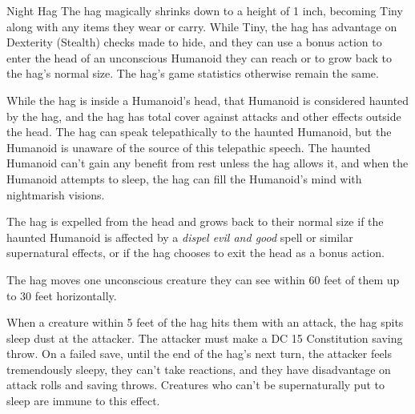 \documentclass[10pt,a4paper,twoside,bg=print,twocolumn,openany,nodeprecatedcode]{dndbook}
\begin{document}
\begin{DndMonster}[float=t]{Night Hag}
The hag magically shrinks down to a height of 1 inch, becoming Tiny along with any items they wear or carry. While Tiny, the hag has advantage on Dexterity (Stealth) checks made to hide, and they can use a bonus action to enter the head of an unconscious Humanoid they can reach or to grow back to the hag's normal size. The hag's game statistics otherwise remain the same.

While the hag is inside a Humanoid's head, that Humanoid is considered haunted by the hag, and the hag has total cover against attacks and other effects outside the head. The hag can speak telepathically to the haunted Humanoid, but the Humanoid is unaware of the source of this telepathic speech. The haunted Humanoid can't gain any benefit from rest unless the hag allows it, and when the Humanoid attempts to sleep, the hag can fill the Humanoid's mind with nightmarish visions.

The hag is expelled from the head and grows back to their normal size if the haunted Humanoid is affected by a \textit{dispel evil and good} spell or similar supernatural effects, or if the hag chooses to exit the head as a bonus action.

The hag moves one unconscious creature they can see within 60 feet of them up to 30 feet horizontally.

When a creature within 5 feet of the hag hits them with an attack, the hag spits sleep dust at the attacker. The attacker must make a DC 15 Constitution saving throw. On a failed save, until the end of the hag's next turn, the attacker feels tremendously sleepy, they can't take reactions, and they have disadvantage on attack rolls and saving throws. Creatures who can't be supernaturally put to sleep are immune to this effect.

\end{DndMonster}
\end{document}
